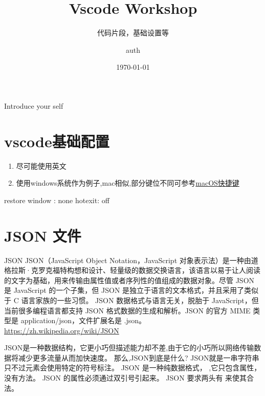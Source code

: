 \documentclass{beamer}
\author{auth}
\title{Vscode Workshop}
\subtitle{代码片段，基础设置等}
\institute [SSTIA] {SSTIA}
\date{\today}
\begin{document}
\begin{frame}
    \maketitle
    \begin{note}
        {Introduce your self}
    \end{note}

\end{frame}

\begin{frame}
    \tableofcontents[sectionstyle=show,subsectionstyle=show/shaded/hide,subsubsectionstyle=show/shaded/hide]
\end{frame}

\section{vscode基础配置}
\begin{frame}
    \begin{enumerate}
        \item 尽可能使用英文
        \item 使用windows系统作为例子,mac相似,部分键位不同可参考\href{https://code.visualstudio.com/shortcuts/keyboard-shortcuts-macos.pdf}{macOS快捷键}
    \end{enumerate}

\end{frame}
\begin{frame}
    restore window : none
    hotexit: off
\end{frame}
\section{JSON 文件}

\begin{frame}{JSON}
    JSON（JavaScript Object Notation，JavaScript 对象表示法）是一种由道格拉斯·克罗克福特构想和设计、轻量级的数据交换语言，该语言以易于让人阅读的文字为基础，用来传输由属性值或者序列性的值组成的数据对象。尽管 JSON 是 JavaScript 的一个子集，但 JSON 是独立于语言的文本格式，并且采用了类似于 C 语言家族的一些习惯。
    JSON 数据格式与语言无关，脱胎于 JavaScript，但当前很多编程语言都支持 JSON 格式数据的生成和解析。JSON 的官方 MIME 类型是 application/json，文件扩展名是 .json。 \url{https://zh.wikipedia.org/wiki/JSON}
    \begin{note}
        {JSON是一种数据结构，它更小巧但描述能力却不差,由于它的小巧所以网络传输数据将减少更多流量从而加快速度。
        那么,JSON到底是什么?
        JSON就是一串字符串 只不过元素会使用特定的符号标注。
        JSON 是一种纯数据格式，
        ,它只包含属性，没有方法。
        JSON 的属性必须通过双引号引起来。
        JSON 要求两头有 {} 来使其合法。}
    \end{note}
\end{frame}
\end{document}

